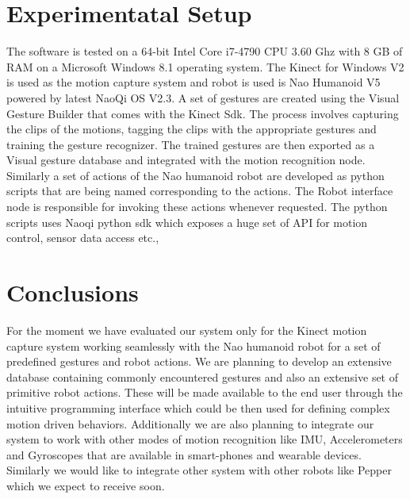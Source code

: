 \documentclass{llncs}
\begin{document}
\section{Experimentatal Setup}
%
The software is tested on a 64-bit Intel Core i7-4790 CPU 3.60 Ghz with 8 GB of RAM on a  Microsoft Windows 8.1 operating system. The Kinect for Windows V2 is used as the motion capture system and robot is used is Nao Humanoid V5 powered by latest NaoQi OS V2.3. A set of gestures are created using the Visual Gesture Builder that comes with the Kinect Sdk\cite{KinectSDK2014}. The process involves capturing the clips of the motions, tagging the clips with the appropriate gestures and training the gesture recognizer. The trained gestures are then exported as a Visual gesture database and integrated with the motion recognition node. Similarly a set of actions of the Nao humanoid robot are developed as python scripts that are being named corresponding to the actions. The Robot interface node is responsible for invoking these actions whenever requested. The python scripts uses Naoqi python sdk which exposes a huge set of API for motion control, sensor data access etc.,
%
\section{Conclusions}
%
For the moment we have evaluated our system only for the Kinect motion capture system working seamlessly with the Nao humanoid robot for a set of predefined gestures and robot actions. We are planning to develop an extensive database containing commonly encountered gestures and also an extensive set of primitive robot actions. These will be made available to the end user through the intuitive programming interface which could be then used for defining complex motion driven behaviors. Additionally we are also planning to integrate our system to work with other modes of motion recognition like IMU, Accelerometers and Gyroscopes that are available in smart-phones and wearable devices. Similarly we would like to integrate other system with other robots like Pepper which we expect to receive soon.
%
\end{document}
